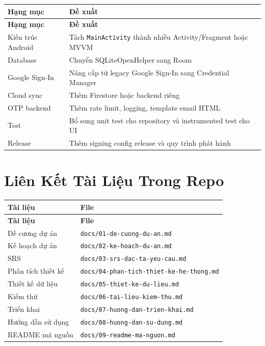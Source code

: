 \documentclass[12pt,a4paper]{report}
\begin{document}
\begin{longtable}{|>{\raggedright\arraybackslash}p{}|>{\raggedright\arraybackslash}p{}|}
\hline
\textbf{Hạng mục} & \textbf{Đề xuất} \\ \hline
\endfirsthead
\hline
\textbf{Hạng mục} & \textbf{Đề xuất} \\ \hline
\endhead
Kiến trúc Android & Tách \texttt{MainActivity} thành nhiều Activity/Fragment hoặc MVVM \\ \hline
Database & Chuyển SQLiteOpenHelper sang Room \\ \hline
Google Sign-In & Nâng cấp từ legacy Google Sign-In sang Credential Manager \\ \hline
Cloud sync & Thêm Firestore hoặc backend riêng \\ \hline
OTP backend & Thêm rate limit, logging, template email HTML \\ \hline
Test & Bổ sung unit test cho repository và instrumented test cho UI \\ \hline
Release & Thêm signing config release và quy trình phát hành \\ \hline
\end{longtable}

\section{Liên Kết Tài Liệu Trong Repo}

\begin{longtable}{|>{\raggedright\arraybackslash}p{}|>{\raggedright\arraybackslash}p{}|}
\hline
\textbf{Tài liệu} & \textbf{File} \\ \hline
\endfirsthead
\hline
\textbf{Tài liệu} & \textbf{File} \\ \hline
\endhead
Đề cương dự án & \texttt{docs/01-de-cuong-du-an.md} \\ \hline
Kế hoạch dự án & \texttt{docs/02-ke-hoach-du-an.md} \\ \hline
SRS & \texttt{docs/03-srs-dac-ta-yeu-cau.md} \\ \hline
Phân tích thiết kế & \texttt{docs/04-phan-tich-thiet-ke-he-thong.md} \\ \hline
Thiết kế dữ liệu & \texttt{docs/05-thiet-ke-du-lieu.md} \\ \hline
Kiểm thử & \texttt{docs/06-tai-lieu-kiem-thu.md} \\ \hline
Triển khai & \texttt{docs/07-huong-dan-trien-khai.md} \\ \hline
Hướng dẫn sử dụng & \texttt{docs/08-huong-dan-su-dung.md} \\ \hline
README mã nguồn & \texttt{docs/09-readme-ma-nguon.md} \\ \hline
\end{longtable}
\clearpage
\end{document}

